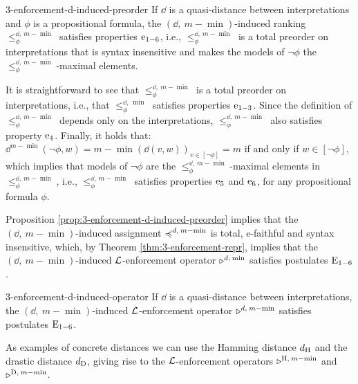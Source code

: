 \begin{prp}{}{3-enforcement-d-induced-preorder}
	If $\dd$ is a quasi-distance between interpretations and $\phi$ is a propositional formula, 
	the ${(\dd,\:m-\min)}$-induced ranking $\le^{\dd,\:m-\min}_\phi$ 
	satisfies properties $\mathrm{e}_{1-6}$, 
	i.e., $\le^{\dd,\:m-\min}_\phi$ is a total preorder 
	on interpretations that	is syntax insensitive and 
	makes the models of $\lnot\phi$ the 
	$\le^{\dd,\:m-\min}_\phi$-maximal elements.
\end{prp}
\begin{prf*}{}{}%
	It is straightforward to see that $\le_{\phi}^{\dd,\:m-\min}$ 
	is a total preorder on interpretations,
	i.e., that $\le_{\phi}^{\dd,\:\min}$ satisfies properties $\mathrm{e}_{1-3}$.
	Since the definition of $\le_{\phi}^{\dd,\:m-\min}$ 
	depends only on the interpretations,
	$\le_{\phi}^{\dd,\:m-\min}$ also satisfies property $\mathrm{e}_{4}$.
	Finally, it holds that:
	$\dd^{m-\min}(\lnot\phi,w) = m- \min(\dd(v,w))_{v\in[\lnot\phi]} = m$ if and only if
	$w\in[\lnot\phi]$, 
	which implies that models of $\lnot\phi$ are the $\le_{\phi}^{\dd,\:m-\min}$-maximal
	elements in $\le_{\phi}^{\dd,\:m-\min}$,
	i.e., $\le_{\phi}^{\dd,\:m-\min}$ satisfies 
	properties $\mathrm{e}_{5}$ and $\mathrm{e}_{6}$, 
	for any propositional formula $\phi$.		
\end{prf*}

Proposition \ref{prop:3-enforcement-d-induced-preorder} 
implies that the $({\dd,\:m-\min})$-induced assignment $\preccurlyeq^{d,\:m-{\operatorname{min}}}$ 
is total, e-faithful and syntax insensitive, 
which, by Theorem \ref{thm:3-enforcement-repr}, 
implies that the $({\dd,\:m-\min})$-induced $\mathcal{L}$-enforcement operator 
$\triangleright^{d,\:{\operatorname{min}}}$ satisfies postulates $\mathrm{E}_{1-6}$.

\begin{crl}{}{3-enforcement-d-induced-operator}
	If $\dd$ is a quasi-distance between interpretations, 
	the $(\dd,\:m-\min)$-induced $\mathcal{L}$-enforcement 
	operator $\triangleright^{d,\:m-{\operatorname{min}}}$ 
	satisfies postulates $\mathrm{E}_{1-6}$.
\end{crl}

As examples of concrete distances we can use the Hamming distance $d_{{\operatorname{H}}}$
and the drastic distance $d_{{\operatorname{D}}}$, giving rise to the $\mathcal{L}$-enforcement operators 
$\triangleright^{{\operatorname{H}},\:m-{\operatorname{min}}}$ and $\triangleright^{{\operatorname{D}},\:m-{\operatorname{min}}}$.

